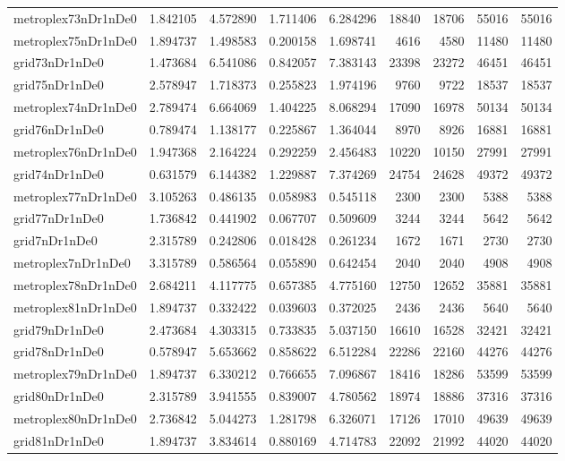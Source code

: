 \begin{longtable}{|l|r|r|r|r|r|r|r|r|}
metroplex73nDr1nDe0 & 1.842105 & 4.572890 & 1.711406 & 6.284296 & 18840 & 18706 & 55016 & 55016 \\
metroplex75nDr1nDe0 & 1.894737 & 1.498583 & 0.200158 & 1.698741 & 4616 & 4580 & 11480 & 11480 \\
grid73nDr1nDe0 & 1.473684 & 6.541086 & 0.842057 & 7.383143 & 23398 & 23272 & 46451 & 46451 \\
grid75nDr1nDe0 & 2.578947 & 1.718373 & 0.255823 & 1.974196 & 9760 & 9722 & 18537 & 18537 \\
metroplex74nDr1nDe0 & 2.789474 & 6.664069 & 1.404225 & 8.068294 & 17090 & 16978 & 50134 & 50134 \\
grid76nDr1nDe0 & 0.789474 & 1.138177 & 0.225867 & 1.364044 & 8970 & 8926 & 16881 & 16881 \\
metroplex76nDr1nDe0 & 1.947368 & 2.164224 & 0.292259 & 2.456483 & 10220 & 10150 & 27991 & 27991 \\
grid74nDr1nDe0 & 0.631579 & 6.144382 & 1.229887 & 7.374269 & 24754 & 24628 & 49372 & 49372 \\
metroplex77nDr1nDe0 & 3.105263 & 0.486135 & 0.058983 & 0.545118 & 2300 & 2300 & 5388 & 5388 \\
grid77nDr1nDe0 & 1.736842 & 0.441902 & 0.067707 & 0.509609 & 3244 & 3244 & 5642 & 5642 \\
grid7nDr1nDe0 & 2.315789 & 0.242806 & 0.018428 & 0.261234 & 1672 & 1671 & 2730 & 2730 \\
metroplex7nDr1nDe0 & 3.315789 & 0.586564 & 0.055890 & 0.642454 & 2040 & 2040 & 4908 & 4908 \\
metroplex78nDr1nDe0 & 2.684211 & 4.117775 & 0.657385 & 4.775160 & 12750 & 12652 & 35881 & 35881 \\
metroplex81nDr1nDe0 & 1.894737 & 0.332422 & 0.039603 & 0.372025 & 2436 & 2436 & 5640 & 5640 \\
grid79nDr1nDe0 & 2.473684 & 4.303315 & 0.733835 & 5.037150 & 16610 & 16528 & 32421 & 32421 \\
grid78nDr1nDe0 & 0.578947 & 5.653662 & 0.858622 & 6.512284 & 22286 & 22160 & 44276 & 44276 \\
metroplex79nDr1nDe0 & 1.894737 & 6.330212 & 0.766655 & 7.096867 & 18416 & 18286 & 53599 & 53599 \\
grid80nDr1nDe0 & 2.315789 & 3.941555 & 0.839007 & 4.780562 & 18974 & 18886 & 37316 & 37316 \\
metroplex80nDr1nDe0 & 2.736842 & 5.044273 & 1.281798 & 6.326071 & 17126 & 17010 & 49639 & 49639 \\
grid81nDr1nDe0 & 1.894737 & 3.834614 & 0.880169 & 4.714783 & 22092 & 21992 & 44020 & 44020 \\

\end{longtable}

